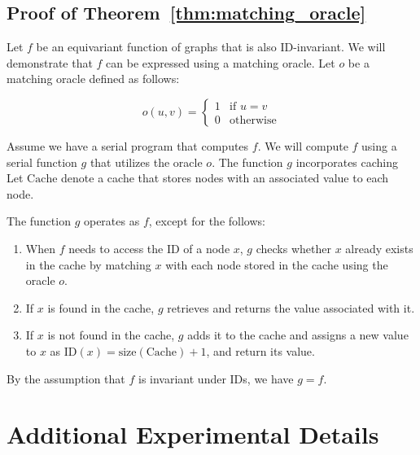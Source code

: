 \subsection{Proof of Theorem~\ref{thm:matching_oracle}}
Let \( f \) be an equivariant function of graphs that is also ID-invariant. We will demonstrate that \( f \) can be expressed using a matching oracle. Let \( o \) be a matching oracle defined as follows:

\[
o(u, v) = 
\begin{cases} 
1 & \text{if } u = v \\ 
0 & \text{otherwise}
\end{cases}
\]

Assume we have a serial program that computes \( f \). We will compute \( f \) using a serial function \( g \) that utilizes the oracle \( o \). The function \( g \) incorporates caching  Let \( \text{Cache} \) denote a cache that stores nodes with an associated value to each node.

The function \( g \) operates as $f$, except for the follows:

\begin{enumerate}[label=(\alph*)]
    \item When \( f \) needs to access the ID of a node \( x \), $g$ checks whether \( x \) already exists in the cache by matching \( x \) with each node stored in the cache using the oracle \( o \).
    
    \item If \( x \) is found in the cache, \( g \) retrieves and returns the value associated with it.
    
    \item If \( x \) is not found in the cache, \( g \) adds it to the cache and assigns a new value to \( x \) as \( \text{ID}(x) = \text{size}(\text{Cache}) + 1 \), and return its value.
\end{enumerate}

By the assumption that \( f \) is invariant under IDs, we have \( g = f \).


 \section{Additional Experimental Details} \label{app:experimental_settings}


